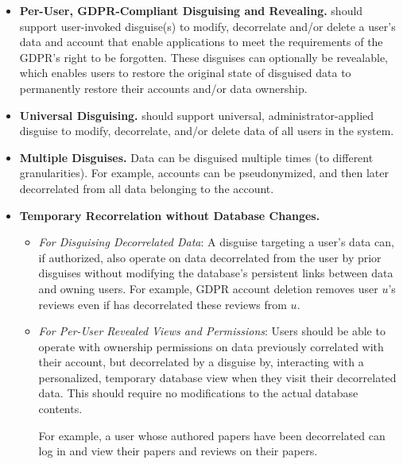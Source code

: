 \begin{itemize}
    \item\textbf{Per-User, GDPR-Compliant Disguising and Revealing.}
\sys should support user-invoked disguise(s) to modify, decorrelate and/or delete a user's data and
        account that enable applications to meet the requirements of the GDPR's right to be
        forgotten.
%
These disguises can optionally be revealable, which enables users to restore the original state of
        disguised data to \eg permanently restore their accounts and/or data ownership.

\item\textbf{Universal Disguising.}
\sys should support universal, administrator-applied disguise to modify, decorrelate, and/or delete
        data of all users in the system.

\item\textbf{Multiple Disguises.}
Data can be disguised multiple times (\eg to different granularities). For example, accounts can be
pseudonymized, and then later decorrelated from all data belonging to the account.

\item\textbf{Temporary Recorrelation without Database Changes.}
    \begin{itemize}
        \item \emph{For Disguising Decorrelated Data}: 
            A disguise targeting a user's data can, if authorized, also operate on data decorrelated
            from the user by prior disguises without modifying the database's persistent links between data and
            owning users. For example, GDPR account deletion removes user $u$'s
            reviews even if \sys has decorrelated these reviews from $u$.

    \item \emph{For Per-User Revealed Views and Permissions}:
            Users should be able to operate with ownership permissions on data previously correlated
            with their account, but decorrelated by a disguise by, interacting with a personalized,
            temporary database view when they visit their decorrelated data. This should require no
            modifications to the actual database contents.

            For example, a user whose authored papers have been decorrelated can log in and view their
            papers and reviews on their papers.
\end{itemize}
\end{itemize}

